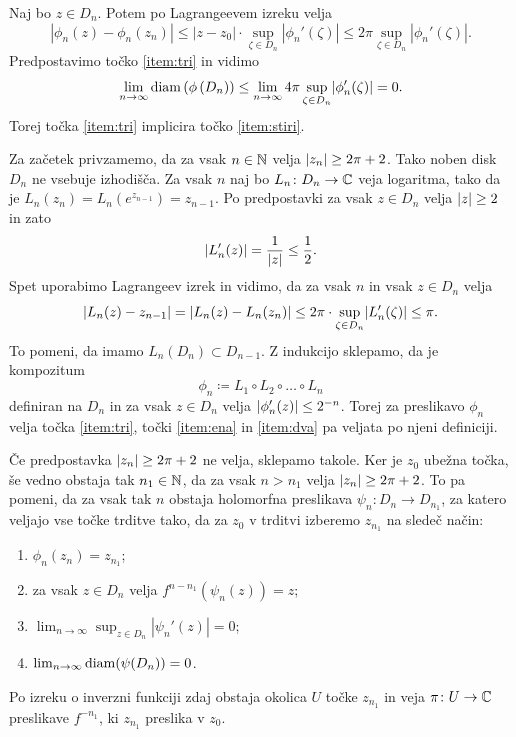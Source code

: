 \begin{dokaz}
    Naj bo \(z \in D_n\). Potem po Lagrangeevem izreku velja
    \begin{equation}
        |\phi_n (z) - \phi_n (z_n)| \leq |z - z_0| \cdot \sup_{\zeta \in D_n} |\phi_n' (\zeta)| \leq 2 \pi \sup_{\zeta \in D_n} |\phi_n' (\zeta)|.
    \end{equation}
    Predpostavimo točko \ref{item:tri} in vidimo
    \[\lim_{n \to \infty} \diam \prt{\phi \prt{D_n}} \leq \lim_{n \to \infty} 4 \pi \sup_{\zeta \in D_n} \abs{\phi_n' (\zeta)} = 0.\]
    Torej točka \ref{item:tri} implicira točko \ref{item:stiri}.

    Za začetek privzamemo, da za vsak \(n \in \mathbb N\) velja \(\lvert z_n\rvert \geq 2 \pi + 2\). Tako noben disk \(D_n\) ne vsebuje izhodišča. Za vsak \(n\) naj bo \(L_n \colon D_n \to \mathbb C\) veja logaritma, tako da je \(L_n (z_n) = L_n (e^{z_{n - 1}}) = z_{n - 1}\). Po predpostavki za vsak \(z \in D_n\) velja \(\lvert z\rvert \geq 2\) in zato
    \[\lvert L_n' (z)\rvert = \frac{1}{\lvert z\rvert} \leq \frac{1}{2}.\]
    Spet uporabimo Lagrangeev izrek in vidimo, da za vsak \(n\) in vsak \(z \in D_n\) velja
    \[\lvert L_n (z) - z_{n - 1}\rvert = \lvert L_n (z) - L_n (z_n)\rvert \leq 2 \pi \cdot \sup_{\zeta \in D_n} \lvert L_n' (\zeta)\rvert \leq \pi.\]
    To pomeni, da imamo \(L_n (D_n) \subset D_{n - 1}\). Z indukcijo sklepamo, da je kompozitum
    \[\phi_n \coloneq L_1 \circ L_2 \circ \dots \circ L_n\]
    definiran na \(D_n\) in za vsak \(z \in D_n\) velja \(\lvert\phi_n' (z)\rvert \leq 2^{-n}\). Torej za preslikavo \(\phi_n\) velja točka \ref{item:tri}, točki \ref{item:ena} in \ref{item:dva} pa veljata po njeni definiciji.

    Če predpostavka \(\lvert z_n\rvert \geq 2 \pi + 2\) ne velja, sklepamo takole. Ker je \(z_0\) ubežna točka, še vedno obstaja tak \(n_1 \in \mathbb N\), da za vsak \(n > n_1\) velja \(\lvert z_n\rvert \geq 2 \pi + 2\). To pa pomeni, da za vsak tak \(n\) obstaja holomorfna preslikava \(\psi_n \colon D_n \to D_{n_1}\), za katero veljajo vse točke trditve tako, da za \(z_0\) v trditvi izberemo \(z_{n_1}\) na sledeč način:
    \begin{enumerate}
        \item \(\phi_n (z_n) = z_{n_1}\);
        \item za vsak \(z \in D_n\) velja \(f^{n - n_1} (\psi_n (z)) = z\);
        \item \(\lim_{n \to \infty} \sup_{z \in D_n} |\psi_n' (z)| = 0\);
        \item \(\lim_{n \to \infty} \operatorname{diam} (\psi (D_n)) = 0\).
    \end{enumerate}
    Po izreku o inverzni funkciji zdaj obstaja okolica \(U\) točke \(z_{n_1}\) in veja \(\pi \colon U \to \mathbb C\) preslikave \(f^{- n_1}\), ki \(z_{n_1}\) preslika v \(z_0\).


\end{dokaz}

